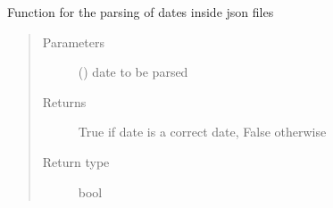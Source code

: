 
\begin{fulllineitems}
\label{\detokenize{eboa.engine:eboa.engine.functions.is_datetime}}
Function for the parsing of dates inside json files
\begin{quote}\begin{description}
\item[{Parameters}] \leavevmode
{} () \textendash{} date to be parsed

\item[{Returns}] \leavevmode
True if date is a correct date, False otherwise

\item[{Return type}] \leavevmode
bool

\end{description}\end{quote}

\end{fulllineitems}


\begin{fulllineitems}
\label{\detokenize{eboa.engine:eboa.engine.functions.is_valid_date_filters}}
\end{fulllineitems}


\begin{fulllineitems}
\label{\detokenize{eboa.engine:eboa.engine.functions.is_valid_float_filters}}
\end{fulllineitems}


\begin{fulllineitems}
\label{\detokenize{eboa.engine:eboa.engine.functions.is_valid_operator_like}}
\end{fulllineitems}

